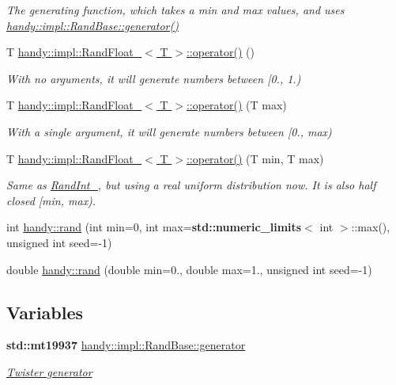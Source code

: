 \begin{DoxyCompactItemize}
\begin{DoxyCompactList}\small\item\em The generating function, which takes a {\ttfamily min} and {\ttfamily max} values, and uses \hyperlink{group__RandomGroup_gaecbff587706065e3d20a81de01123c9f}{handy\+::impl\+::\+Rand\+Base\+::generator()} \end{DoxyCompactList}\item 
T \hyperlink{group__RandomGroup_ga3448918864fd58b3dcbdad0c548323ce}{handy\+::impl\+::\+Rand\+Float\+\_\+$<$ T $>$\+::operator()} ()
\begin{DoxyCompactList}\small\item\em With no arguments, it will generate numbers between \mbox{[}0., 1.) \end{DoxyCompactList}\item 
T \hyperlink{group__RandomGroup_ga8a3a1dc2369d8758d43250474a1c391d}{handy\+::impl\+::\+Rand\+Float\+\_\+$<$ T $>$\+::operator()} (T max)
\begin{DoxyCompactList}\small\item\em With a single argument, it will generate numbers between \mbox{[}0., max) \end{DoxyCompactList}\item 
T \hyperlink{group__RandomGroup_ga36eca80e7e43044caec35d03f27df419}{handy\+::impl\+::\+Rand\+Float\+\_\+$<$ T $>$\+::operator()} (T min, T max)
\begin{DoxyCompactList}\small\item\em Same as \textquotesingle{}\hyperlink{structhandy_1_1impl_1_1RandInt__}{Rand\+Int\+\_\+}\textquotesingle{}, but using a real uniform distribution now. It is also half closed \mbox{[}min, max). \end{DoxyCompactList}\item 
int \hyperlink{group__RandomGroup_gafd96a435a958e1e7f9a7354d77fda735}{handy\+::rand} (int min=0, int max={\bf std\+::numeric\+\_\+limits}$<$ int $>$\+::max(), unsigned int seed=-\/1)
\item 
double \hyperlink{group__RandomGroup_ga8d9c1e9192ab9c278e91c3afaf28d069}{handy\+::rand} (double min=0., double max=1., unsigned int seed=-\/1)
\end{DoxyCompactItemize}
\subsection*{Variables}
\begin{DoxyCompactItemize}
\item 
{\bf std\+::mt19937} \hyperlink{group__RandomGroup_gaecbff587706065e3d20a81de01123c9f}{handy\+::impl\+::\+Rand\+Base\+::generator}
\begin{DoxyCompactList}\small\item\em \hyperlink{}{Twister generator }\end{DoxyCompactList}\end{DoxyCompactItemize}


